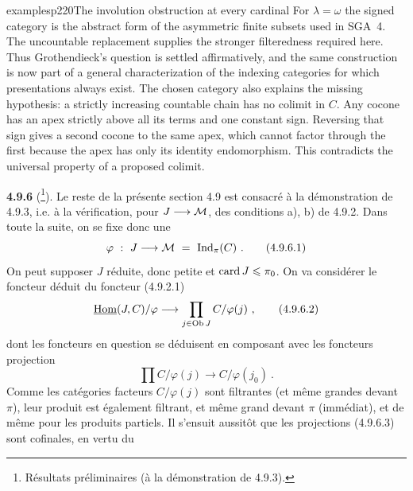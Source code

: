 \begin{dcomment}{examples}{p220}{The involution obstruction at every cardinal}
For $\lambda=\omega$ the signed category is the abstract form of the asymmetric finite subsets used in SGA~4.  The uncountable replacement supplies the stronger filteredness required here.  Thus Grothendieck's question is settled affirmatively, and the same construction is now part of a general characterization of the indexing categories for which presentations always exist.  The chosen category also explains the missing hypothesis: a strictly increasing countable chain has no colimit in $C$.  Any cocone has an apex strictly above all its terms and one constant sign.  Reversing that sign gives a second cocone to the same apex, which cannot factor through the first because the apex has only its identity endomorphism.  This contradicts the universal property of a proposed colimit.
\end{dcomment}



\textbf{4.9.6} (\footnote[96]{Résultats préliminaires (à la démonstration de 4.9.3).}). Le reste de la présente section 4.9 est consacré à la démonstration de 4.9.3, i.e. à la vérification, pour $J \longrightarrow \mathcal{M}$, des conditions a), b) de 4.9.2. Dans toute la suite, on se fixe donc une
\[
\varphi \ : \ J \longrightarrow \cM \ = \ \Ind_\pi(C) \ . \tag*{(4.9.6.1)}
\]
On peut supposer $J$ réduite, donc petite et $\operatorname{card} J \leqslant \pi_0$. On va considérer le foncteur déduit du foncteur (4.9.2.1)
\[
\uHom(J,C)/\varphi \longrightarrow \prod_{j \in \Ob J} C/\varphi(j) \ , \tag*{(4.9.6.2)}
\]
dont les foncteurs en question se déduisent en composant avec les foncteurs projection
\[
\prod C/\varphi(j) \longrightarrow C/\varphi(j_0) \ . \tag*{(4.9.6.3)}
\]
Comme les catégories facteurs $C/\varphi(j)$ sont filtrantes (et même grandes devant $\pi$), leur produit est également filtrant, et même grand devant $\pi$ (immédiat), et de même
pour les produits partiels. Il s'ensuit aussitôt que les projections (4.9.6.3) sont cofinales, en vertu du


